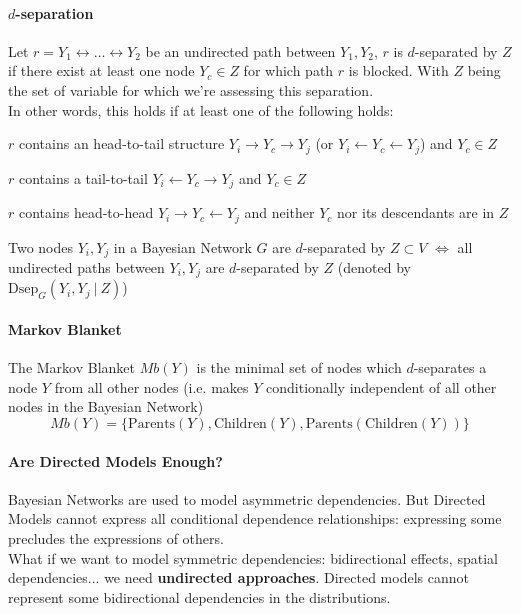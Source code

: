 \documentclass[10pt]{report}
\begin{document}
\paragraph{$d$-separation} Let $r = Y_1\leftrightarrow\ldots\leftrightarrow Y_2$ be an undirected path between $Y_1,Y_2$, $r$ is $d$-separated by $Z$ if there exist at least one node $Y_c\in Z$ for which path $r$ is blocked. With $Z$ being the set of variable for which we're assessing this separation.\\
In other words, this holds if at least one of the following holds:\begin{list}{}{}
	\item $r$ contains an head-to-tail structure $Y_i\rightarrow Y_c\rightarrow Y_j$ (or $Y_i\leftarrow Y_c\leftarrow Y_j$) and $Y_c \in Z$
	\item $r$ contains a tail-to-tail $Y_i\leftarrow Y_c\rightarrow Y_j$ and $Y_c \in Z$
	\item $r$ contains head-to-head $Y_i\rightarrow Y_c\leftarrow Y_j$ and neither $Y_c$ nor its descendants are in $Z$
\end{list}
Two nodes $Y_i,Y_j$ in a Bayesian Network $G$ are $d$-separated by $Z\subset V$ $\Leftrightarrow$ all undirected paths between $Y_i,Y_j$ are $d$-separated by $Z$ (denoted by $\text{Dsep}_G(Y_i,Y_j\:|\:Z)$)
\paragraph{Markov Blanket} The Markov Blanket $Mb(Y)$ is the minimal set of nodes which $d$-separates a node $Y$ from all other nodes (i.e. makes $Y$ conditionally independent of all other nodes in the Bayesian Network)
$$Mb(Y) = \{\text{Parents}(Y), \text{Children}(Y), \text{Parents}(\text{Children}(Y))\}$$
\paragraph{Are Directed Models Enough?} Bayesian Networks are used to model asymmetric dependencies. But Directed Models cannot express all conditional dependence relationships: expressing some precludes the expressions of others.\\
What if we want to model symmetric dependencies: bidirectional effects, spatial dependencies... we need \textbf{undirected approaches}. Directed models cannot represent some bidirectional dependencies in the distributions.
\end{document}

